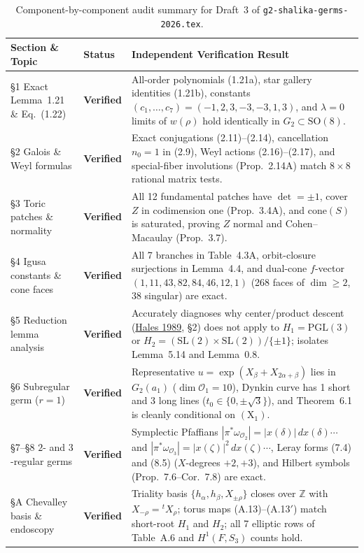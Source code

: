 \documentclass[11pt,letterpaper]{article}
\newcommand{\ooo}{\mathcal{O}}
\begin{document}
\begin{table}[!htbp]
\centering
\small
\begin{tabularx}{\linewidth}{@{}l l X@{}}
\toprule
\textbf{Section \& Topic} & \textbf{Status} & \textbf{Independent Verification Result} \\
\midrule
\S1 Exact Lemma~1.21 \& Eq.~(1.22) & {\color{okgreen}\textbf{Verified}} & All-order polynomials (1.21a), star gallery identities (1.21b), constants $(c_1,\dots,c_7)=(-1,2,3,-3,-3,1,3)$, and $\lambda=0$ limits of $w(\rho)$ hold identically in $G_2\subset\mathrm{SO}(8)$. \\
\S2 Galois \& Weyl formulas & {\color{okgreen}\textbf{Verified}} & Exact conjugations (2.11)--(2.14), cancellation $n_0=1$ in (2.9), Weyl actions (2.16)--(2.17), and special-fiber involutions (Prop.~2.14A) match $8\times 8$ rational matrix tests. \\
\S3 Toric patches \& normality & {\color{okgreen}\textbf{Verified}} & All 12 fundamental patches have $\det=\pm 1$, cover $Z$ in codimension one (Prop.~3.4A), and $\mathrm{cone}(S)$ is saturated, proving $Z$ normal and Cohen--Macaulay (Prop.~3.7). \\
\S4 Igusa constants \& cone faces & {\color{okgreen}\textbf{Verified}} & All 7 branches in Table~4.3A, orbit-closure surjections in Lemma~4.4, and dual-cone $f$-vector $(1,11,43,82,84,46,12,1)$ (268 faces of $\dim\ge 2$, 38 singular) are exact. \\
\S5 Reduction lemma analysis & {\color{okgreen}\textbf{Verified}} & Accurately diagnoses why center/product descent (\href{https://www.numdam.org/article/AST_1989__171-172__195_0.pdf}{Hales 1989}, \S2) does not apply to $H_1=\mathrm{PGL}(3)$ or $H_2=(\mathrm{SL}(2)\times\mathrm{SL}(2))/\{\pm 1\}$; isolates Lemma~5.14 and Lemma~0.8. \\
\S6 Subregular germ ($r=1$) & {\color{okgreen}\textbf{Verified}} & Representative $u=\exp(X_\beta+X_{2\alpha+\beta})$ lies in $G_2(a_1)$ ($\dim\ooo_1=10$), Dynkin curve has 1 short and 3 long lines ($t_0\in\{0,\pm\sqrt{3}\}$), and Theorem~6.1 is cleanly conditional on $(\mathrm{X}_1)$. \\
\S7--\S8 $2$- and $3$-regular germs & {\color{okgreen}\textbf{Verified}} & Symplectic Pfaffians $|\pi^*\omega_{\ooo_2}|=|x(\delta)|\,dx(\delta)\cdots$ and $|\pi^*\omega_{\ooo_3}|=|x(\zeta)|^2\,dx(\zeta)\cdots$, Leray forms (7.4) and (8.5) ($X$-degrees $+2,+3$), and Hilbert symbols (Prop.~7.6--Cor.~7.8) are exact. \\
\S A Chevalley basis \& endoscopy & {\color{okgreen}\textbf{Verified}} & Triality basis $\{h_\alpha,h_\beta,X_{\pm\rho}\}$ closes over $\mathbb{Z}$ with $X_{-\rho}={}^t X_\rho$; torus maps (A.13)--(A.13$'$) match short-root $H_1$ and $H_2$; all 7 elliptic rows of Table~A.6 and $H^1(F,S_3)$ counts hold. \\
\bottomrule
\end{tabularx}
\caption{Component-by-component audit summary for Draft~3 of \texttt{g2-shalika-germs-2026.tex}.}
\label{tab:audit3}
\end{table}
\end{document}
